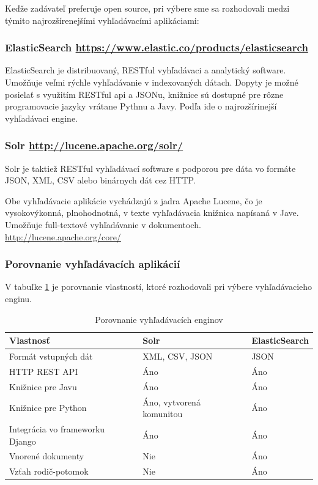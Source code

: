 \documentclass[thesis=M,slovak]{FITthesis}[2013/05/06]
\begin{document}
Keďže zadávateľ preferuje open source, pri výbere sme sa rozhodovali medzi týmito najrozšírenejšími vyhľadávacími aplikáciami:
\subsubsection{ElasticSearch \url{https://www.elastic.co/products/elasticsearch}}

ElasticSearch je distribuovaný, RESTful vyhľadávaci a analytický software. Umožňuje veľmi rýchle vyhľadávanie v indexovaných dátach. Dopyty je možné posielať s využitím RESTful api a JSONu, knižnice sú dostupné pre rôzne programovacie jazyky vrátane Pythnu a Javy. Podľa \cite{NajpouzivanejsieVyhladavace} ide o najrozšírinejší vyhľadávaci engine.

\subsubsection{Solr \url{http://lucene.apache.org/solr/}}

Solr je taktiež RESTful vyhľadávací software s podporou pre dáta vo formáte JSON, XML, CSV alebo binárnych dát cez HTTP.

Obe vyhľadávacie aplikácie vychádzajú z jadra Apache Lucene, čo je vysokovýkonná, plnohodnotná, v texte vyhľadávacia knižnica napísaná v Jave. Umožňuje full-textové vyhľadávanie v dokumentoch. \url{http://lucene.apache.org/core/}

\subsubsection{Porovnanie vyhľadávacích aplikácií}
V tabuľke \ref{tab:searchEngines} je porovnanie vlastností, ktoré rozhodovali pri výbere vyhľadávacieho enginu.

\begin{table}[!htbp]\centering
 	\caption[ElasticSearch vs. Solr]{Porovnanie vyhľadávacích enginov}\label{tab:searchEngines}
\begin{tabularx}{\textwidth}{|l|X|X|} \hline
Vlastnosť & Solr                         & ElasticSearch \\ \hline
Formát vstupných dát   & XML, CSV, JSON	 & JSON \\ \hline
HTTP REST API & Áno & Áno \\ \hline
Knižnice pre Javu & Áno & Áno \\ \hline
Knižnice pre Python & Áno, vytvorená komunitou & Áno \\ \hline
Integrácia vo frameworku Django & Áno & Áno \\ \hline
Vnorené dokumenty & Nie & Áno \\ \hline
Vzťah rodič-potomok & Nie & Áno \\ \hline
\end{tabularx}
\end{table}
\end{document}
